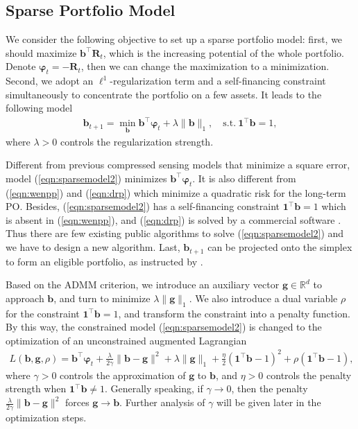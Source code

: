 \documentclass[twoside,11pt]{article}
\begin{document}
\subsection{Sparse Portfolio Model}
\label{sec:sparsemodel}
We consider the following objective to set up a sparse portfolio model: first, we should maximize $\mathbf{b}^\top\mathbf{R}_t$, which is the increasing potential of the whole portfolio. Denote $\bm{\varphi}_t=-\mathbf{R}_t$, then we can change the maximization to a minimization. Second, we adopt an $\ell^1$-regularization term and a self-financing constraint simultaneously to concentrate the portfolio on a few assets. It leads to the following model
\begin{eqnarray}
\label{eqn:sparsemodel2}
\mathbf{b}_{t+1}=\min_{\mathbf{b}} \mathbf{b}^\top\bm{\varphi}_t+\lambda\|\mathbf{b}\|_1, \quad\text{s.t.}\: \mathbf{1}^\top\mathbf{b}=1,
\end{eqnarray}
where $\lambda>0$ controls the regularization strength. 

Different from previous compressed sensing models \citep{sparsepo,itershrin,multclassimg} that minimize a square error, model (\ref{eqn:sparsemodel2}) minimizes $\mathbf{b}^\top\bm{\varphi}_t$. It is also different from (\ref{eqn:wenpp}) and (\ref{eqn:drp}) which minimize a quadratic risk for the long-term PO. Besides, (\ref{eqn:sparsemodel2}) has a self-financing constraint $\mathbf{1}^\top\mathbf{b}=1$ which is absent in (\ref{eqn:wenpp}), and (\ref{eqn:drp}) is solved by a commercial software \citep{doubleregu}. Thus there are few existing public algorithms to solve (\ref{eqn:sparsemodel2}) and we have to design a new algorithm. Last, $\mathbf{b}_{t+1}$ can be projected onto the simplex to form an eligible portfolio, as instructed by \citet{simplexproject,OLMAR,RMR2}.

 


Based on the ADMM criterion, we introduce an auxiliary vector $\mathbf{g}\in \mathbb{R}^d$ to approach $\mathbf{b}$, and turn to minimize $\lambda\|\mathbf{g}\|_1$. We also introduce a dual variable $\rho$ for the constraint $\mathbf{1}^\top\mathbf{b}=1$, and transform the constraint into a penalty function. By this way, the constrained model (\ref{eqn:sparsemodel2}) is changed to the optimization of an unconstrained augmented Lagrangian
\begin{align}
\label{eqn:unconstrainedmodel}
 L(\mathbf{b},\mathbf{g},\rho)=\mathbf{b}^\top\bm{\varphi}_t+\frac{\lambda}{2\gamma}\|\mathbf{b}-\mathbf{g}\|^2+\lambda\|\mathbf{g}\|_1+\frac{\eta}{2}(\mathbf{1}^\top\mathbf{b}-1)^2+\rho(\mathbf{1}^\top\mathbf{b}-1),
\end{align}
where $\gamma>0$ controls the approximation of $\mathbf{g}$ to $\mathbf{b}$, and $\eta>0$ controls the penalty strength when $\mathbf{1}^\top\mathbf{b}\ne 1$. Generally speaking, if $\gamma \rightarrow 0$, then the penalty $\frac{\lambda}{2\gamma}\|\mathbf{b}-\mathbf{g}\|^2$ forces $\mathbf{g}\rightarrow \mathbf{b}$. Further analysis of $\gamma$ will be given later in the optimization steps.
\end{document}
